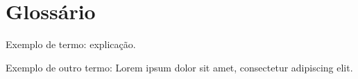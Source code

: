 \chapter*{Glossário}
\noindent Exemplo de termo: explicação.

\noindent Exemplo de outro termo: Lorem ipsum dolor sit amet, consectetur adipiscing elit.

\OnesideTwoside{\clearpage}{\cleardoublepage}